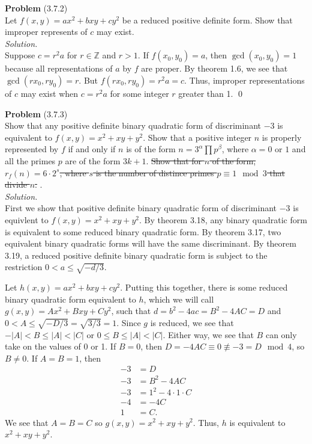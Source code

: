 \documentclass[12 pt]{amsart}
\begin{document}
\phantom{\quad} \vfill
\noindent
\textbf{Problem} (3.7.2) \\[4ex]
  Let $f(x,y) = ax^2 + bxy + cy^2$ be a reduced positive definite form.
  Show that improper represents of $c$ may exist.
  \\[2ex]
\emph{Solution.} \\[2ex]
  Suppose $c = r^2 a$ for $r \in \mathbb{Z}$ and $r > 1$.
  If $f(x_0, y_0) = a$, then $\gcd(x_0, y_0) = 1$ because all representations
  of $a$ by $f$ are proper.
  By theorem 1.6, we see that $\gcd(rx_0, ry_0) = r$.
  But $f(rx_0, ry_0) = r^2 a = c$.
  Thus, improper representations of $c$ may exist when $c = r^2 a$ for some
  integer $r$ greater than 1.
  \qed
\vfill
\newpage



\phantom{\quad} \vfill
\noindent
\textbf{Problem} (3.7.3) \\[4ex]
  Show that any positive definite binary quadratic form of discriminant
  $-3$ is equivalent to $f(x,y) = x^2 + xy + y^2$.
  Show that a positive integer $n$ is properly represented by $f$
  if and only if $n$ is of the form 
  $n = 3^{\alpha} \prod p^{\beta}$,
  where $\alpha = 0$ or $1$ and all the primes $p$ are of the form
  $3k + 1$. 
  \sout{
  Show that for $n$ of the form, $r_f(n) = 6 \cdot 2^s$, where $s$
  is the number of distince primes $p \equiv 1 \mod 3$ that divide $n$.
  }.
  \\[2ex]
\emph{Solution.} \\[2ex]
  First we show that positive definite binary quadratic form of discriminant
  $-3$ is equivlent to $f(x,y) = x^2 + xy + y^2$.
  By theorem 3.18, any binary quadratic form is equivalent to 
  some reduced binary quadratic form.
  By theorem 3.17, two equivalent binary quadratic forms
  will have the same discriminant. 
  By theorem 3.19, a reduced positive definite binary quadratic form is subject to the
  restriction $0 < a \leq \sqrt{-d/3}$.

  Let $h(x,y) = ax^2 + bxy + cy^2$.
  Putting this together, there is some reduced binary quadratic 
  form equivalent to $h$, which we will call
  $g(x,y) = Ax^2 + Bxy + Cy^2$, such that 
  $d = b^2 - 4ac = B^2 - 4AC = D$ and 
  $0 < A \leq \sqrt{-D/3} = \sqrt{3/3} = 1$.
  Since $g$ is reduced, we see that $-|A| < B \leq |A| < |C|$
  or $0 \leq B \leq |A| < |C|$.
  Either way, we see that $B$ can only take on the values of 0 or 1.
  If $B = 0$, then $D = -4AC \equiv 0 \not \equiv -3 = D \mod 4$,
  so $B \neq 0$.
  If $A = B = 1$, then 
  \begin{align*}
    -3 &= D \\
    -3   &= B^2 - 4AC \\
    -3   &= 1^2 - 4 \cdot 1 \cdot C \\
    -4 &=  -4C \\
    1 &= C.
  \end{align*}
  We see that $A = B = C$ so 
  $g(x,y) = x^2 + xy + y^2$.
  Thus, $h$ is equivalent to $x^2 + xy + y^2$.
\end{document}
